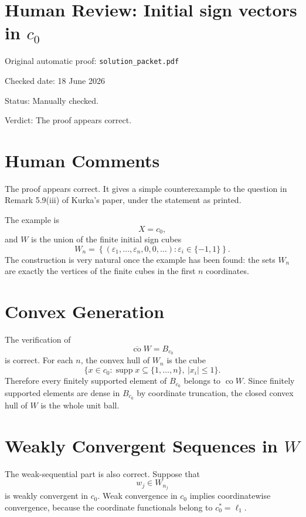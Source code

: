 \documentclass[11pt]{article}
\newcommand{\co}{\operatorname{co}}
\begin{document}
\section*{Human Review: Initial sign vectors in \texorpdfstring{$c_0$}{c0}}

\noindent Original automatic proof: \texttt{solution\_packet.pdf}

\noindent Checked date: 18 June 2026

\noindent Status: Manually checked.

\noindent Verdict: The proof appears correct.

\section*{Human Comments}

The proof appears correct.  It gives a simple counterexample to the question
in Remark 5.9(iii) of Kurka's paper, under the statement as printed.

The example is
\[
  X=c_0,
\]
and \(W\) is the union of the finite initial sign cubes
\[
  W_n=
  \left\{
  (\varepsilon_1,\ldots,\varepsilon_n,0,0,\ldots):
  \varepsilon_i\in\{-1,1\}
  \right\}.
\]
The construction is very natural once the example has been found: the sets
\(W_n\) are exactly the vertices of the finite cubes in the first \(n\)
coordinates.

\section*{Convex Generation}

The verification of
\[
  \overline{\co} W=B_{c_0}
\]
is correct.  For each \(n\), the convex hull of \(W_n\) is the cube
\[
  \{x\in c_0:\operatorname{supp}x\subseteq\{1,\ldots,n\},
    \ |x_i|\leq 1\}.
\]
Therefore every finitely supported element of \(B_{c_0}\) belongs to
\(\co W\).  Since finitely supported elements are dense in \(B_{c_0}\) by
coordinate truncation, the closed convex hull of \(W\) is the whole unit ball.

\section*{Weakly Convergent Sequences in \texorpdfstring{$W$}{W}}

The weak-sequential part is also correct.  Suppose that
\[
  w_j\in W_{n_j}
\]
is weakly convergent in \(c_0\).  Weak convergence in \(c_0\) implies
coordinatewise convergence, because the coordinate functionals belong to
\(c_0^*=\ell_1\).
\end{document}
